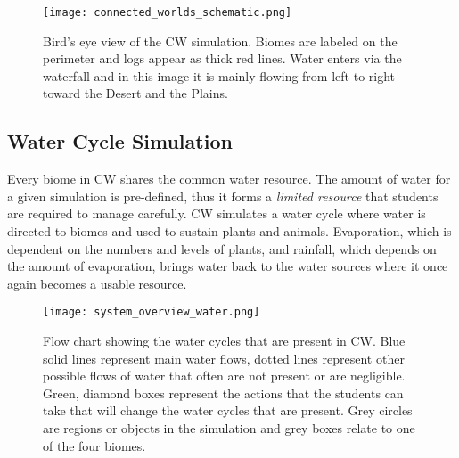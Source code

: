 \begin{figure}
\centering
\texttt{[image: connected\_worlds\_schematic.png]}
\caption{Bird's eye view of the CW simulation. Biomes are labeled on the perimeter and logs appear as thick red lines. Water enters via the waterfall and in this image it is mainly flowing from left to right toward the Desert and the Plains.}
\label{fig:connected_worlds_graphic}
\end{figure}




\subsection{Water Cycle Simulation}
Every biome in CW shares the common water resource. The amount of water for a given simulation is pre-defined, thus it forms a \textit{limited resource} that students are required to manage carefully. CW simulates a water cycle where water is directed to biomes and used to sustain plants and animals. Evaporation, which is dependent on the numbers and levels of plants, and rainfall, which depends on the amount of evaporation, brings water back to the water sources where it once again becomes a usable resource.

\begin{figure}
\centering
\texttt{[image: system\_overview\_water.png]}
\caption{Flow chart showing the water cycles that are present in CW. Blue solid lines represent main water flows, dotted lines represent other possible flows of water that often are not present or are negligible. Green, diamond boxes represent the actions that the students can take that will change the water cycles that are present. Grey circles are regions or objects in the simulation and grey boxes relate to one of the four biomes.}
\label{fig:system_overview_water}
\end{figure}

